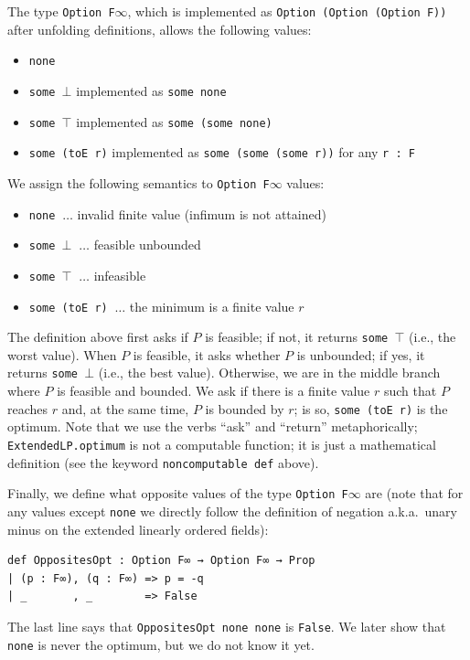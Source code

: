 \documentclass[]{article}
\renewcommand{\.}{\hskip .75pt}
\begin{document}
The type \texttt{Option F$\infty$}, which is implemented as
\texttt{Option (Option (Option F))} after unfolding definitions,
allows the following values:
\begin{itemize}
\item \texttt{none}
\item \texttt{some $\bot$} implemented as \texttt{some none}
\item \texttt{some $\top$} implemented as \texttt{some (some none)}
\item \texttt{some (toE r)} implemented as \texttt{some (some (some r))} for any \texttt{r :~F}
\end{itemize}
We assign the following semantics to \texttt{Option F$\infty$} values:
\begin{itemize}
\item \texttt{none} $\ \dots$ invalid finite value (infimum is not attained)
\item \texttt{some $\bot$} $\ \dots$ feasible unbounded
\item \texttt{some $\top$} $\ \dots$ infeasible
\item \texttt{some (toE r)} $\ \dots$ the minimum is a finite value $r$
\end{itemize}
The definition above first asks if $P$ is feasible; if not, it returns \texttt{some $\top$}
(i.e., the worst value).
When $P$ is feasible, it asks whether $P$ is unbounded; if yes, it returns \texttt{some $\bot$}
(i.e., the best value).
Otherwise, we are in the middle branch where $P$ is feasible and bounded.
We ask if there is a finite value $r$ such that $P$ reaches $r$ and, at the same time,
$P$ is bounded by $r$; is so, \texttt{some (toE r)} is the optimum.
Note that we use the verbs ``ask'' and ``return'' metaphorically;
\texttt{ExtendedLP.optimum} is not a computable function; it is just a mathematical
definition (see the keyword \texttt{noncomputable def} above).

Finally, we define what opposite values of the type \texttt{Option F$\infty$} are
(note that for any values except \texttt{none} we directly follow the definition
of negation a.k.a.\ unary minus on the extended linearly ordered fields):
\begin{lstlisting}
def OppositesOpt : Option F∞ → Option F∞ → Prop
| (p : F∞), (q : F∞) => p = -q
| _       , _        => False
\end{lstlisting}
The last line says that \texttt{OppositesOpt none none} is \texttt{False}.
We later show that \texttt{none} is never the optimum, but we do not know it yet.
\end{document}
